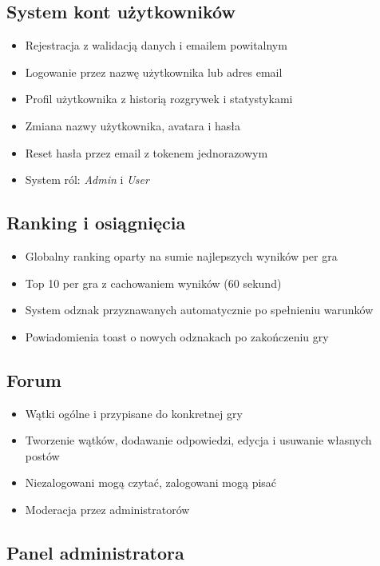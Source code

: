 \documentclass[12pt,a4paper]{article}
\begin{document}
\subsection{System kont użytkowników}

\begin{itemize}[leftmargin=1.5cm]
  \item Rejestracja z walidacją danych i emailem powitalnym
  \item Logowanie przez nazwę użytkownika lub adres email
  \item Profil użytkownika z historią rozgrywek i statystykami
  \item Zmiana nazwy użytkownika, avatara i hasła
  \item Reset hasła przez email z tokenem jednorazowym
  \item System ról: \textit{Admin} i \textit{User}
\end{itemize}

\subsection{Ranking i osiągnięcia}

\begin{itemize}[leftmargin=1.5cm]
  \item Globalny ranking oparty na sumie najlepszych wyników per gra
  \item Top 10 per gra z cachowaniem wyników (60 sekund)
  \item System odznak przyznawanych automatycznie po spełnieniu warunków
  \item Powiadomienia toast o nowych odznakach po zakończeniu gry
\end{itemize}

\subsection{Forum}

\begin{itemize}[leftmargin=1.5cm]
  \item Wątki ogólne i przypisane do konkretnej gry
  \item Tworzenie wątków, dodawanie odpowiedzi, edycja i usuwanie własnych postów
  \item Niezalogowani mogą czytać, zalogowani mogą pisać
  \item Moderacja przez administratorów
\end{itemize}

\subsection{Panel administratora}
\end{document}
